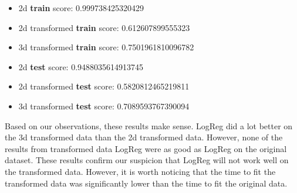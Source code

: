 \documentclass[12pt]{article}
\begin{document}
\begin{enumerate}[leftmargin=\parindent,align=left,labelwidth=\parindent,noitemsep]
\begin{itemize}[topsep=10pt]
\begin{itemize}
        \item 2d \textbf{train} score: 0.999738425320429
        \item 2d transformed \textbf{train} score: 0.612607899555323
        \item 3d transformed \textbf{train} score: 0.7501961810096782 \\
        
        \item 2d \textbf{test} score: 0.9488035614913745
        \item 2d transformed \textbf{test} score: 0.5820812465219811
        \item 3d transformed \textbf{test} score: 0.7089593767390094
    \end{itemize}
    Based on our observations, these results make sense. LogReg did a lot better on the 3d transformed data than the 2d transformed data. However, none of the results from transformed data LogReg were as good as LogReg on the original dataset. These results confirm our suspicion that LogReg will not work well on the transformed data. However, it is worth noticing that the time to fit the transformed data was significantly lower than the time to fit the original data.
    

\end{itemize}
\end{enumerate}
\end{document}
